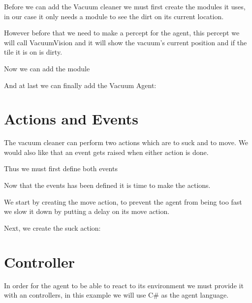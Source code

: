 

Before we can add the Vacuum cleaner we must first create the modules
it uses, in our case it only needs a module to see the dirt on its
current location.

However before that we need to make a percept for the agent, this
percept we will call VacuumVision and it will show the vacuum\textquoteright{}s
current position and if the tile it is on is dirty.



Now we can add the module



And at last we can finally add the Vacuum Agent:






\section{Actions and Events}

The vacuum cleaner can perform two actions which are to suck and to
move. We would also like that an event gets raised when either action
is done.

Thus we must first define both events





Now that the events has been defined it is time to make the actions.

We start by creating the move action, to prevent the agent from being
too fast we slow it down by putting a delay on its move action.



Next, we create the suck action:




\section{Controller}

In order for the agent to be able to react to its environment we must
provide it with an controllers, in this example we will use C\# as
the agent language.

